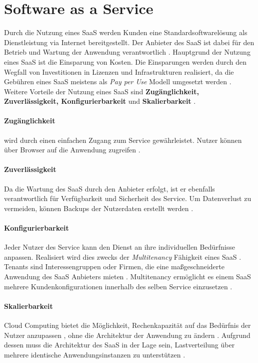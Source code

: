 \section{Software as a Service}
\label{sec:grundlagen:saas}
Durch die Nutzung eines \acf{SaaS} werden Kunden eine Standardsoftwarelösung als Dienstleistung via Internet bereitgestellt.
Der Anbieter des \ac{SaaS} ist dabei für den Betrieb und Wartung der Anwendung verantwortlich \cite{Buxmann2008}.
Hauptgrund der Nutzung eines \ac{SaaS} ist die Einsparung von Kosten.
Die Einsparungen werden durch den Wegfall von Investitionen in Lizenzen und Infrastrukturen realisiert,
da die Gebühren eines \ac{SaaS} meistens als \emph{Pay per Use} Modell umgesetzt werden \cite{Tan2013}.
Weitere Vorteile der Nutzung eines \ac{SaaS} sind \textbf{Zugänglichkeit, Zuverlässigkeit, Konfigurierbarkeit} und \textbf{Skalierbarkeit} \cite{Tan2013}.
\paragraph{Zugänglichkeit}
wird durch einen einfachen Zugang zum Service gewährleistet. Nutzer können über Browser auf die Anwendung zugreifen \cite{Tan2013}.

\paragraph{Zuverlässigkeit}
Da die Wartung des \ac{SaaS} durch den Anbieter erfolgt, ist er ebenfalls verantwortlich für Verfügbarkeit und Sicherheit des Service.
Um Datenverlust zu vermeiden, können Backups der Nutzerdaten erstellt werden \cite{Tan2013}.

\paragraph{Konfigurierbarkeit}
Jeder Nutzer des Service kann den Dienst an ihre individuellen Bedürfnisse anpassen.
Realisiert wird dies zwecks der \emph{Multitenancy} Fähigkeit eines \ac{SaaS} \cite{Tan2013}.
Tenants sind Interessengruppen oder Firmen, die eine maßgeschneiderte Anwendung des \ac{SaaS} Anbieters mieten \cite{Schroeter2012}.
Multitenancy ermöglicht es einem \ac{SaaS} mehrere Kundenkonfigurationen innerhalb des selben Service einzusetzen \cite{Tan2013}.

\paragraph{Skalierbarkeit}
Cloud Computing bietet die Möglichkeit, Rechenkapazität auf das Bedürfnis der Nutzer anzupassen \cite{Tan2013},
ohne die Architektur der Anwendung zu ändern \cite{Satyanarayana2012}.
Aufgrund dessen muss die Architektur des \ac{SaaS} in der Lage sein, Lastverteilung über mehrere identische Anwendungsinstanzen
zu unterstützen \cite{Satyanarayana2012}.